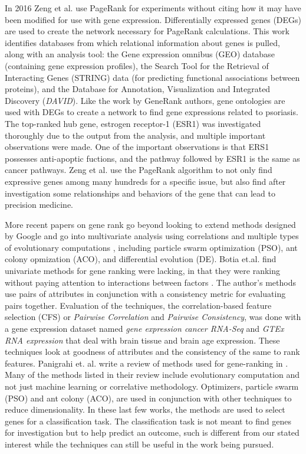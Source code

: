 In 2016 Zeng et al.\cite{zeng2016discovering} use PageRank\cite{langville2004deeper} for experiments without citing how it may have been modified for use with gene expression.
Differentially expressed genes (DEGs) are used to create the network necessary for PageRank calculations.
This work identifies databases from which relational information about genes is pulled, along with an analysis tool: the Gene expression omnibus (GEO) database (containing gene expression profiles), the Search Tool for the Retrieval of Interacting Genes (STRING) data (for predicting functional associations between proteins), and the Database for Annotation, Visualization and Integrated Discovery (\textit{DAVID}).
Like the work by GeneRank authors, gene ontologies are used with DEGs to create a network to find gene expressions related to psoriasis.
The top-ranked hub gene, estrogen receptor-1 (ESR1) was investigated thoroughly due to the output from the analysis, and multiple important observations were made.
One of the important observations is that ERS1 possesses anti-apoptic fuctions, and the pathway followed by ESR1 is the same as cancer pathways.
Zeng et al. use the PageRank algorithm to not only find expressive genes among many hundreds for a specific issue, but also find after investigation some relationships and behaviors of the gene that can lead to precision medicine.

More recent papers on gene rank go beyond looking to extend methods designed by Google and go into multivariate analysis using correlations \cite{Botia:2021} and multiple types of evolutionary computations \cite{Panigrahi:2021}, including particle swarm optimization (PSO), ant colony opmization (ACO), and differential evolution (DE).
Botia et.al. find univariate methods for gene ranking were lacking, in that they were ranking without paying attention to interactions between factors \cite{Botia:2021}. 
The author's methods use pairs of attributes in conjunction with a consistency metric for evaluating pairs together.
Evaluation of the techniques, the correlation-based feature selection (CFS) or \textit{Pairwise Correlation} and \textit{Pairwise Consistency}, was done with a gene expression dataset named \textit{gene expression cancer RNA-Seq} and \textit{GTEx RNA expression} that deal with brain tissue and brain age expression.
These techniques look at goodness of attributes and the consistency of the same to rank features.
Panigrahi et. al. write a review of methods used for gene-ranking in \cite{Panigrahi:2021}.
Many of the methods listed in their review include evolutionary computation and not just machine learning or correlative methodology.
Optimizers, particle swarm (PSO) and ant colony (ACO), are used in conjunction with other techniques to reduce dimensionality.
In these last few works, the methods are used to select genes for a classification task.
The classification task is not meant to find genes for investigation but to help predict an outcome, such is different from our stated interest while the techniques can still be useful in the work being pursued.

